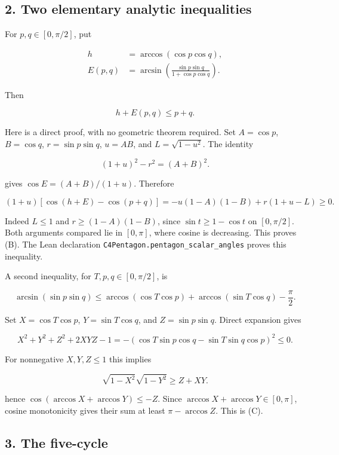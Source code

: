 \documentclass[11pt,a4paper]{article}
\begin{document}
\subsection{2. Two elementary analytic inequalities}\label{two-elementary-analytic-inequalities}

For \(p,q\in[0,\pi/2]\), put

\[
\begin{aligned}h&=\arccos(\cos p\cos q),\\E(p,q)&=\arcsin\!\left(\frac{\sin p\sin q}{1+\cos p\cos q}\right).\end{aligned}
\]

Then

\[
h+E(p,q)\le p+q.\tag{B}
\]

Here is a direct proof, with no geometric theorem required. Set \(A=\cos p\), \(B=\cos q\), \(r=\sin p\sin q\), \(u=AB\), and \(L=\sqrt{1-u^2}\). The identity

\[
(1+u)^2-r^2=(A+B)^2.
\]

gives \(\cos E=(A+B)/(1+u)\). Therefore

\[
(1+u)[\cos(h+E)-\cos(p+q)]=-u(1-A)(1-B)+r(1+u-L)\ge0.
\]

Indeed \(L\le1\) and \(r\ge(1-A)(1-B)\), since \(\sin t\ge1-\cos t\) on \([0,\pi/2]\). Both arguments compared lie in \([0,\pi]\), where cosine is decreasing. This proves (B). The Lean declaration \texttt{C4Pentagon.pentagon\_scalar\_angles} proves this inequality.

A second inequality, for \(T,p,q\in[0,\pi/2]\), is

\[
\arcsin(\sin p\sin q)\le\arccos(\cos T\cos p)+\arccos(\sin T\cos q)-\frac{\pi}{2}.\tag{C}
\]

Set \(X=\cos T\cos p\), \(Y=\sin T\cos q\), and \(Z=\sin p\sin q\). Direct expansion gives

\[
X^2+Y^2+Z^2+2XYZ-1=-(\cos T\sin p\cos q-\sin T\sin q\cos p)^2\le0.
\]

For nonnegative \(X,Y,Z\le1\) this implies

\[
\sqrt{1-X^2}\sqrt{1-Y^2}\ge Z+XY.
\]

hence \(\cos(\arccos X+\arccos Y)\le-Z\). Since \(\arccos X+\arccos Y\in[0,\pi]\), cosine monotonicity gives their sum at least \(\pi-\arccos Z\). This is (C).

\subsection{3. The five-cycle}\label{the-five-cycle}
\end{document}
